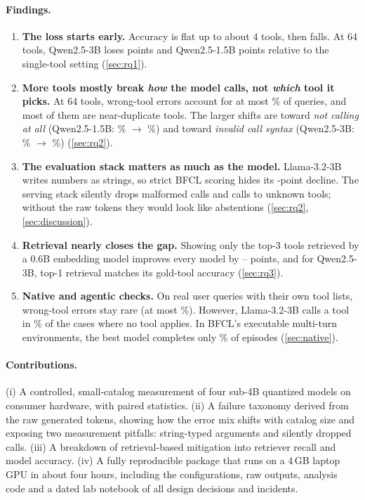 \paragraph{Findings.}
\begin{enumerate}
  \item \textbf{The loss starts early.} Accuracy is flat up to about 4 tools, then falls. At 64 tools, Qwen2.5-3B loses \DropQwenThree{} points and Qwen2.5-1.5B \DropQwenOneFive{} points relative to the single-tool setting (\cref{sec:rq1}).
  \item \textbf{More tools mostly break \emph{how} the model calls, not \emph{which} tool it picks.} At 64 tools, wrong-tool errors account for at most \FailToolQwenOneFiveNSixtyFour\% of queries, and most of them are near-duplicate tools. The larger shifts are toward \emph{not calling at all} (Qwen2.5-1.5B: \FailNoCallQwenOneFiveNOne\% $\to$ \FailNoCallQwenOneFiveNSixtyFour\%) and toward \emph{invalid call syntax} (Qwen2.5-3B: \FailFormatQwenThreeNOne\% $\to$ \FailFormatQwenThreeNSixtyFour\%) (\cref{sec:rq2}).
  \item \textbf{The evaluation stack matters as much as the model.} Llama-3.2-3B writes numbers as strings, so strict BFCL scoring hides its \LenDropLlama-point decline. The serving stack silently drops malformed calls and calls to unknown tools; without the raw tokens they would look like abstentions (\cref{sec:rq2}, \cref{sec:discussion}).
  \item \textbf{Retrieval nearly closes the gap.} Showing only the top-3 tools retrieved by a 0.6B embedding model improves every model by \RetGainQwenThreeFive--\RetGainQwenOneFive{} points, and for Qwen2.5-3B, top-1 retrieval matches its gold-tool accuracy (\cref{sec:rq3}).
  \item \textbf{Native and agentic checks.} On real user queries with their own tool lists, wrong-tool errors stay rare (at most \NatWrongToolQwenThree\%). However, Llama-3.2-3B calls a tool in \NatAbstInvLlama\% of the cases where no tool applies. In BFCL's executable multi-turn environments, the best model completes only \MtSuccQwenThree\% of episodes (\cref{sec:native}).
\end{enumerate}

\paragraph{Contributions.}
(i) A controlled, small-catalog measurement of four sub-4B quantized models on consumer hardware, with paired statistics.
(ii) A failure taxonomy derived from the raw generated tokens, showing how the error mix shifts with catalog size and exposing two measurement pitfalls: string-typed arguments and silently dropped calls.
(iii) A breakdown of retrieval-based mitigation into retriever recall and model accuracy.
(iv) A fully reproducible package that runs on a 4\,GB laptop GPU in about four hours, including the configurations, raw outputs, analysis code and a dated lab notebook of all design decisions and incidents.
